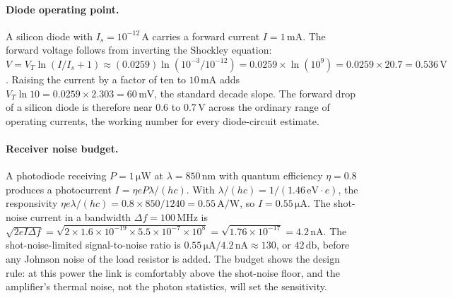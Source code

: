 \paragraph{Diode operating point.}
A silicon diode with $I_{s} = 10^{-12}\,\si{\ampere}$ carries a forward
current $I = 1\,\si{\milli\ampere}$. The forward voltage follows from
inverting the Shockley equation: $V = V_{T}\ln(I/I_{s} + 1) \approx
(0.0259)\ln(10^{-3}/10^{-12}) = 0.0259 \times \ln(10^{9}) = 0.0259
\times 20.7 = 0.536\,\si{\volt}$. Raising the current by a factor of
ten to $10\,\si{\milli\ampere}$ adds $V_{T}\ln 10 = 0.0259 \times 2.303
= 60\,\si{\milli\volt}$, the standard decade slope. The forward drop of
a silicon diode is therefore near $0.6$ to $0.7\,\si{\volt}$ across the
ordinary range of operating currents, the working number for every
diode-circuit estimate.

\paragraph{Receiver noise budget.}
A photodiode receiving $P = 1\,\si{\micro\watt}$ at $\lambda = 850\,
\si{\nano\meter}$ with quantum efficiency $\eta = 0.8$ produces a
photocurrent $I = \eta e P \lambda / (hc)$. With $\lambda/(hc) = 1/(1.46
\,\si{\electronvolt}\cdot e) $, the responsivity $\eta e\lambda/(hc) =
0.8 \times 850/1240 = 0.55\,\si{\ampere\per\watt}$, so $I = 0.55\,\si{
\micro\ampere}$. The shot-noise current in a bandwidth $\Delta f = 100
\,\si{\mega\hertz}$ is $\sqrt{2eI\Delta f} = \sqrt{2 \times 1.6\times
10^{-19}\times 5.5\times 10^{-7}\times 10^{8}} = \sqrt{1.76\times
10^{-17}} = 4.2\,\si{\nano\ampere}$. The shot-noise-limited
signal-to-noise ratio is $0.55\,\si{\micro\ampere}/4.2\,\si{\nano
\ampere} \approx 130$, or $42\,\si{\decibel}$, before any Johnson noise
of the load resistor is added. The budget shows the design rule: at
this power the link is comfortably above the shot-noise floor, and the
amplifier's thermal noise, not the photon statistics, will set the
sensitivity.


